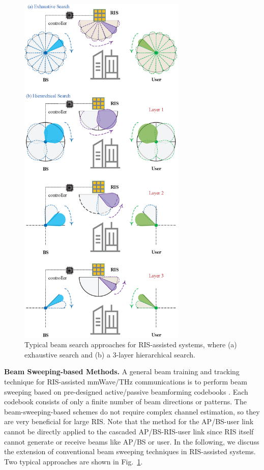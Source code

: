 \documentclass[journal,comsoc]{IEEEtran}
\begin{document}
\begin{figure}[t]
	\centering
	\includegraphics[width=8cm]{Use-Case-RIS-beam-sweeping.eps}
	\caption{Typical beam search approaches for RIS-assisted systems, where (a) exhaustive search and (b) a 3-layer hierarchical search.}
	\label{fig:Use-Case-RIS-beam-sweeping}
\end{figure}


{\bf{Beam Sweeping-based Methods.}} A general beam training and tracking technique for RIS-assisted mmWave/THz communications is to perform beam sweeping based on pre-designed active/passive beamforming codebooks \cite{Fast-Beam-Training-IRS-2020,Terahertz-MIMO-RIS-2021,Joint-Beam-Training-Positioning-RIS-2021,Distributed-Beam-Training-2021,Multi-Path-Beam-Routing-RIS-2022,Beam-Training-Alignment-RIS-2022,Codebook-design-beam-training-RIS-2022,Fast-Beam-Training-Alignment-IRS-2022}. Each codebook consists of only a finite number of beam directions or patterns. The beam-sweeping-based schemes do not require complex channel estimation, so they are very beneficial for large RIS. Note that the method for the AP/BS-user link cannot be directly applied to the cascaded AP/BS-RIS-user link since RIS itself cannot generate or receive beams like AP/BS or user. In the following, we discuss the extension of conventional beam sweeping techniques in RIS-assisted systems. Two typical approaches are shown in Fig.~\ref{fig:Use-Case-RIS-beam-sweeping}.
\end{document}
